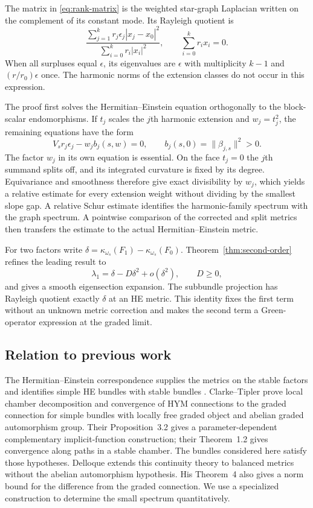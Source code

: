 \documentclass[11pt]{amsart}
\theoremstyle{remark}
\begin{document}
The matrix in \eqref{eq:rank-matrix} is the weighted star-graph
Laplacian written on the complement of its constant mode. Its Rayleigh
quotient is
\begin{equation}\label{eq:graph-intro}
 \frac{\sum_{j=1}^kr_j\epsilon_j|x_j-x_0|^2}
      {\sum_{i=0}^kr_i|x_i|^2},\qquad \sum_{i=0}^kr_ix_i=0.
\end{equation}
When all surpluses equal $\epsilon$, its eigenvalues are $\epsilon$
with multiplicity $k-1$ and $(r/r_0)\epsilon$ once. The harmonic
norms of the extension classes do not occur in this expression.

The proof first solves the Hermitian--Einstein equation orthogonally
to the block-scalar endomorphisms. If $t_j$ scales the $j$th harmonic
extension and $w_j=t_j^2$, the remaining equations have the form
\[
 V_sr_j\epsilon_j-w_jb_j(s,w)=0,
 \qquad b_j(s,0)=\|\beta_{j,s}\|^2>0.
\]
The factor $w_j$ in its own equation is essential. On the face $t_j=0$
the $j$th summand splits off, and its integrated curvature is fixed by
its degree. Equivariance and smoothness therefore give exact
divisibility by $w_j$, which yields a relative estimate for every
extension weight without dividing by the smallest slope gap. A relative
Schur estimate identifies the harmonic-family spectrum with the graph
spectrum. A pointwise comparison of the corrected and split metrics
then transfers the estimate to the actual Hermitian--Einstein metric.

For two factors write
$\delta=\kappa_{\omega_s}(F_1)-\kappa_{\omega_s}(F_0)$.
Theorem~\ref{thm:second-order} refines the leading result to
\[
 \lambda_1=\delta-D\delta^2+o(\delta^2),\qquad D\ge0,
\]
and gives a smooth eigensection expansion. The subbundle projection
has Rayleigh quotient exactly $\delta$ at an HE metric. This identity
fixes the first term without an unknown metric correction and makes
the second term a Green-operator expression at the graded limit.

\subsection*{Relation to previous work}
The Hermitian--Einstein correspondence supplies the metrics on the
stable factors and identifies simple HE bundles with stable bundles
\cite{UY,Kobayashi}. Clarke--Tipler \cite{CT} prove local chamber
decomposition and convergence of HYM connections to the graded
connection for simple bundles with locally free graded object and
abelian graded automorphism group. Their Proposition~3.2 gives a
parameter-dependent complementary implicit-function construction;
their Theorem~1.2 gives convergence along paths in a stable chamber.
The bundles considered here satisfy those hypotheses. Delloque
\cite{Delloque} extends this continuity theory to balanced metrics
without the abelian automorphism hypothesis. His Theorem~4 also gives
a norm bound for the difference from the graded connection.
We use a specialized construction to determine the small spectrum
quantitatively.
\end{document}
